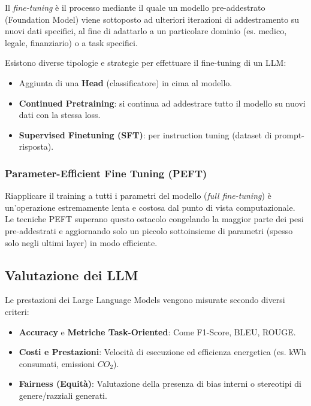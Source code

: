         Il \textit{fine-tuning} è il processo mediante il quale un modello pre-addestrato (Foundation Model) viene sottoposto ad ulteriori iterazioni di addestramento su nuovi dati specifici, al fine di adattarlo a un particolare dominio (es. medico, legale, finanziario) o a task specifici.

        Esistono diverse tipologie e strategie per effettuare il fine-tuning di un LLM:
        \begin{itemize}
            \item Aggiunta di una \textbf{Head} (classificatore) in cima al modello.
            \item \textbf{Continued Pretraining}: si continua ad addestrare tutto il modello su nuovi dati con la stessa loss.
            \item \textbf{Supervised Finetuning (SFT)}: per instruction tuning (dataset di prompt-risposta).
        \end{itemize}

        \subsubsection{Parameter-Efficient Fine Tuning (PEFT)}
            Riapplicare il training a tutti i parametri del modello (\textit{full fine-tuning}) è un'operazione estremamente lenta e costosa dal punto di vista computazionale. 
            Le tecniche PEFT superano questo ostacolo congelando la maggior parte dei pesi pre-addestrati e aggiornando solo un piccolo sottoinsieme di parametri (spesso solo negli ultimi layer) in modo efficiente.

    \subsection{Valutazione dei LLM}

        Le prestazioni dei Large Language Models vengono misurate secondo diversi criteri:
        \begin{itemize}
            \item \textbf{Accuracy} e \textbf{Metriche Task-Oriented}: Come F1-Score, BLEU, ROUGE.
            \item \textbf{Costi e Prestazioni}: Velocità di esecuzione ed efficienza energetica (es. kWh consumati, emissioni $CO_2$).
            \item \textbf{Fairness (Equità)}: Valutazione della presenza di bias interni o stereotipi di genere/razziali generati.
        \end{itemize}


